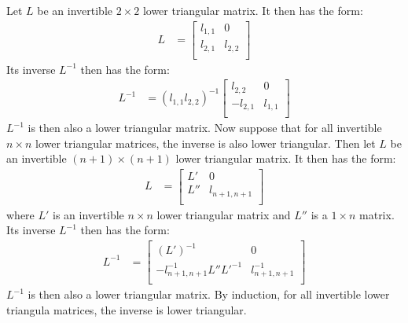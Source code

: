 \documentclass{article}
\begin{document}
\problem{}
Let $L$ be an invertible $2\times 2$ lower triangular matrix. It then has the form:
\begin{align*}
    L & = \begin{bmatrix}
        l_{1,1} & 0 \\
        l_{2,1} & l_{2,2} \\
    \end{bmatrix}
\end{align*}
Its inverse $L^{-1}$ then has the form:
\begin{align*}
    L^{-1} & = (l_{1,1}l_{2,2})^{-1}\begin{bmatrix}
        l_{2,2} & 0 \\
        -l_{2,1} & l_{1,1} \\
    \end{bmatrix}
\end{align*}
$L^{-1}$ is then also a lower triangular matrix. Now suppose that for all invertible $n\times n$ lower triangular matrices, the inverse is also lower triangular. Then let $L$ be an invertible $(n + 1) \times (n + 1)$ lower triangular matrix. It then has the form:
\begin{align*}
    L & = \begin{bmatrix}
        L' & 0 \\
        L'' & l_{n + 1, n + 1} \\
    \end{bmatrix}
\end{align*}
where $L'$ is an invertible $n \times n$ lower triangular matrix and $L''$ is a $1\times n$ matrix. Its inverse $L^{-1}$ then has the form:
\begin{align*}
    L^{-1} & = \begin{bmatrix}
        (L')^{-1} & 0 \\
        -l_{n + 1, n + 1}^{-1}L''{L'}^{-1} & l_{n + 1, n + 1}^{-1} \\
    \end{bmatrix}
\end{align*}
$L^{-1}$ is then also a lower triangular matrix. By induction, for all invertible lower triangula matrices, the inverse is lower triangular.

\clearpage
\end{document}
